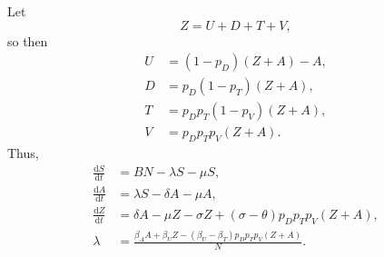 \documentclass{article}
\newcommand{\md}{\mathrm{d}}
\begin{document}
Let
\begin{equation}
  Z =  U + D + T + V,
\end{equation}
so then
\begin{equation}
  \begin{split}
    U &= (1 - p_D) (Z + A) - A,
    \\
    D &= p_D (1 - p_T) (Z + A),
    \\
    T &= p_D p_T (1 - p_V) (Z + A),
    \\
    V &= p_D p_T p_V (Z + A).
  \end{split}
\end{equation}
Thus,
\begin{equation}
  \begin{split}
    \frac{\md S}{\md t} &= B N - \lambda S - \mu S,
    \\
    \frac{\md A}{\md t} &= \lambda S - \delta A - \mu A,
    \\
    \frac{\md Z}{\md t} &= \delta A - \mu Z - \sigma Z
    + (\sigma - \theta) p_D p_T p_V (Z + A),
    \\
    \lambda &= \frac{\beta_A A + \beta_U Z
      - (\beta_U - \beta_T) p_D p_T p_V (Z + A)}{N}.
  \end{split}
\end{equation}
\end{document}
